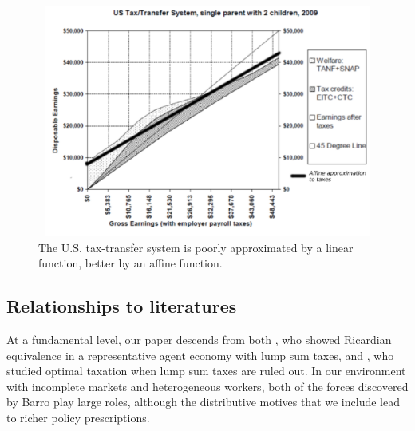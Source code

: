 \documentclass[thmsb,11pt]{article}
\begin{document}
  \begin{figure}[htp]
 \centering
 \includegraphics[width=5in,height=3in]{Draft25Graphs/affine_taxes.pdf}
 \caption{ The U.S. tax-transfer system is poorly approximated by a linear function, better by an affine
function.}
 \label{fig:affine_taxes}
 \end{figure}


\subsection{Relationships to literatures}

At a fundamental level, our paper descends from both \citet{Barro1974}, who showed Ricardian equivalence in a representative agent economy with lump sum taxes, and \citet{Barro1979}, who studied  optimal taxation  when lump sum taxes are ruled out. In our environment with incomplete markets and heterogeneous workers,  both of the forces discovered by Barro play large roles, although the distributive motives that we include lead to  richer policy prescriptions.
\end{document}
